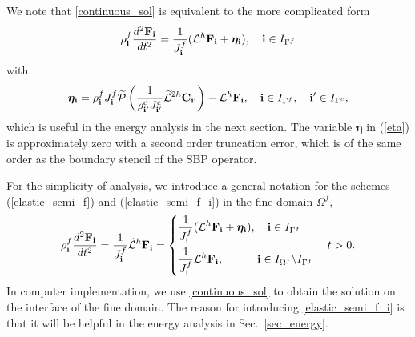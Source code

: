 We note that \eqref{continuous_sol} is equivalent to the more complicated form
\begin{equation}\label{elastic_semi_f_i}
{\rho}^f_{\bf i} \frac{d^2{\bf F}_{\bf i}}{dt^2} =
\frac{1}{J^f_{\bf i}}(\mathcal{L}^h{\bf F}_{\bf i} + {\bm \eta}_{\bf i}), \quad {\bf i}\in I_{\Gamma^f}
\end{equation}
with 
\begin{equation}\label{eta}
{\bm \eta}_{\bf i} = {\rho}^f_{\bf i}J^f_{\bf i}\wt{\mathcal{P}}\left(\frac{1}{\rho^c_{{\bf i}'}J^c_{{\bf i}'}}\wt{\mathcal{L}}^{2h} {\bf C}_{{\bf i}'}\right) - \mathcal{L}^{h}{\bf F}_{\bf i}, \quad {\bf i}\in I_{\Gamma^f},\quad {{\bf i}'}\in I_{\Gamma^c},
\end{equation}
which is useful in the energy analysis in the next section. The variable $\bm \eta$ in (\ref{eta}) is approximately zero with a second order truncation error, which is of the same order as the boundary stencil of the SBP operator. %

For the simplicity of analysis, we introduce a general notation for the schemes (\ref{elastic_semi_f}) and (\ref{elastic_semi_f_i}) in the fine domain $\Omega^f$,
\begin{align}\label{fine_scheme}
{\rho}^f_{\bf i}\frac{d^2{\bf F}_{\bf i}}{dt^2} =\frac{1}{J^f_{\bf i}}\hat{\mathcal{L}}^h{\bf F}_{\bf i} = \left\{
\begin{aligned}
&\frac{1}{J^f_{\bf i}}(\mathcal{L}^h{\bf F}_{\bf i} +{\bm \eta}_{\bf i}), \quad {\bf i}\in I_{\Gamma^f}\\
&\frac{1}{J^f_{\bf i}}\mathcal{L}^h{\bf F}_{\bf i},\quad\quad\quad {\bf i}\in I_{\Omega^f}\backslash I_{\Gamma^f} 
\end{aligned}
\right. \quad t > 0.
\end{align}
In computer implementation, we use \eqref{continuous_sol} to obtain the solution on the interface of the fine domain. The reason for introducing    \eqref{elastic_semi_f_i} is that it will be helpful in the energy analysis in Sec.~\ref{sec_energy}.

